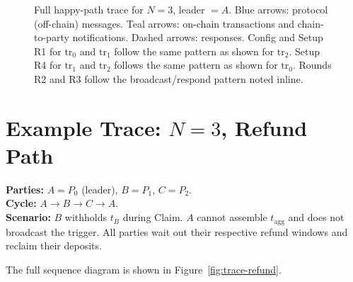 \documentclass[11pt,a4paper,dvipsnames]{article}
\newcommand{\tagg}{t_{\mathrm{agg}}}
\begin{document}
\begin{figure}[p]
\caption{Full happy-path trace for $N=3$, leader $= A$.
  Blue arrows: protocol (off-chain) messages.
  Teal arrows: on-chain transactions and chain-to-party notifications.
  Dashed arrows: responses.
  Config and Setup R1 for $\mathrm{tr}_0$ and $\mathrm{tr}_1$ follow the same
  pattern as shown for $\mathrm{tr}_2$.
  Setup R4 for $\mathrm{tr}_1$ and $\mathrm{tr}_2$ follows the same pattern
  as shown for $\mathrm{tr}_0$.
  Rounds R2 and R3 follow the broadcast/respond pattern noted inline.}
\label{fig:trace}
\end{figure}

\section{Example Trace: $N = 3$, Refund Path}

\noindent
\textbf{Parties:} $A = P_0$ (leader), $B = P_1$, $C = P_2$.\\
\textbf{Cycle:} $A \to B \to C \to A$.\\
\textbf{Scenario:} $B$ withholds $t_B$ during Claim.
$A$ cannot assemble $\tagg$ and does not broadcast the trigger.
All parties wait out their respective refund windows and reclaim their
deposits.

The full sequence diagram is shown in Figure~\ref{fig:trace-refund}.
\end{document}
